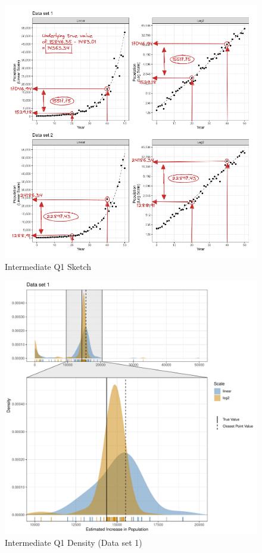 \documentclass[print]{nuthesis}
\begin{document}
\begin{figure}[tbp]

{\centering \includegraphics[width=1\linewidth,]{images/03-estimation/qi1-sketch} 

}

\caption{Intermediate Q1 Sketch}\label{fig:qi1-sketch}
\end{figure}

\begin{figure}[tbp]

{\centering \includegraphics[width=1\linewidth,]{thesis_files/figure-latex/qi1-density-1-1} 

}

\caption{Intermediate Q1 Density (Data set 1)}\label{fig:qi1-density-1}
\end{figure}
\end{document}
